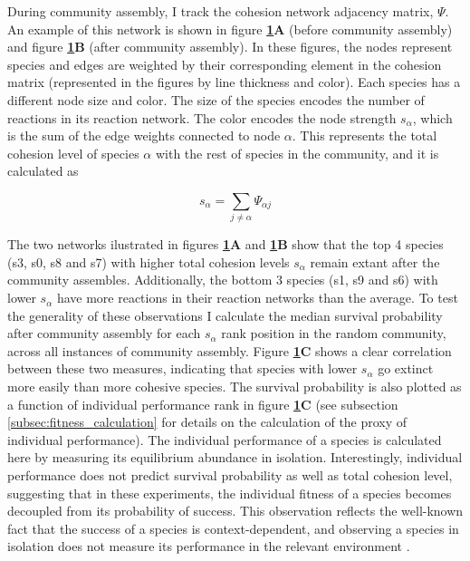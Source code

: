 \documentclass[titlepage,11pt]{article}
\begin{document}
\begin{linenumbers}
\begin{singlespace}
\begin{figure}
				\label{fig:interaction_evolution}
			\end{figure}
			During community assembly, I track the cohesion network adjacency matrix, $ \Psi $. An example of this network is shown in figure \textbf{\ref{fig:interaction_evolution}A} (before community assembly) and figure \textbf{\ref{fig:interaction_evolution}B} (after community assembly). In these figures, the nodes represent species and edges are weighted by their corresponding element in the cohesion matrix (represented in the figures by line thickness and color). Each species has a different node size and color. The size of the species encodes the number of reactions in its reaction network. The color encodes the node strength $ s_{\alpha} $, which is the sum of the edge weights connected to node $ \alpha $. This represents the total cohesion level of species $ \alpha $ with the rest of species in the community, and it is calculated as
			\begin{linenomath*}
				\begin{equation}
				s_{\alpha} = \sum_{j \neq \alpha} \Psi_{\alpha j}
				\end{equation}
			\end{linenomath*}
			The two networks ilustrated in figures \textbf{\ref{fig:interaction_evolution}A} and \textbf{\ref{fig:interaction_evolution}B} show that the top 4 species (s3, s0, s8 and s7) with higher total cohesion levels $ s_{\alpha} $ remain extant after the community assembles. Additionally, the bottom 3 species (s1, s9 and s6) with lower $ s_{\alpha} $ have more reactions in their reaction networks than the average. To test the generality of these observations I calculate the median survival probability after community assembly for each $ s_{\alpha} $ rank position in the random community, across all instances of community assembly. Figure \textbf{\ref{fig:interaction_evolution}C} shows a clear correlation between these two measures, indicating that species with lower $ s_{\alpha} $ go extinct more easily than more cohesive species. The survival probability is also plotted as a function of individual performance rank in figure \textbf{\ref{fig:interaction_evolution}C} (see subsection \ref{subsec:fitness_calculation} for details on the calculation of the proxy of individual performance). The individual performance of a species is calculated here by measuring its equilibrium abundance in isolation. Interestingly, individual performance does not predict survival probability as well as total cohesion level, suggesting that in these experiments, the individual fitness of a species becomes decoupled from its probability of success. This observation reflects the well-known fact that the success of a species is context-dependent, and observing a species in isolation does not measure its performance in the relevant environment \citep{Tikhonov2016, McGill2006, Mcintire2014}.\\ %

\end{singlespace}
\end{linenumbers}
\end{document}
